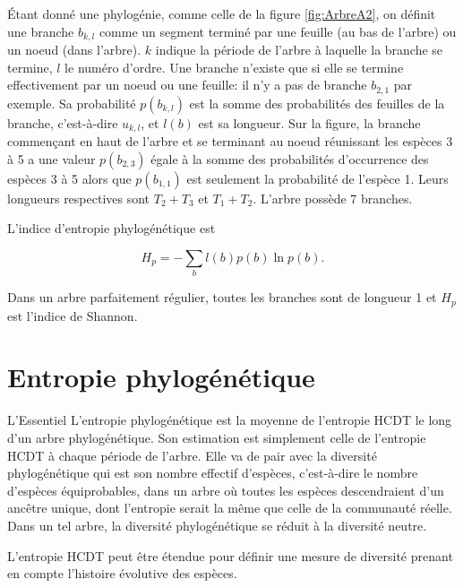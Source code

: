 \documentclass[
  11pt,
  french,
  a4paper,
  extrafontsizes,onecolumn,openright
  ]{memoir}
\newenvironment{Summary}
  {\begin{bclogo}[logo=\bctrombone, noborder=true, couleur=lightgray!50]{L'Essentiel}\parindent0pt}
  {\end{bclogo}}
\newlength{\rf}
\begin{document}
\normalsize

Étant donné une phylogénie, comme celle de la figure \ref{fig:ArbreA2}, on définit une branche \(b_{k,l}\) comme un segment terminé par une feuille (au bas de l'arbre) ou un noeud (dans l'arbre).
\(k\) indique la période de l'arbre à laquelle la branche se termine, \(l\) le numéro d'ordre.
Une branche n'existe que si elle se termine effectivement par un noeud ou une feuille: il n'y a pas de branche \(b_{2,1}\) par exemple.
Sa probabilité \(p(b_{k,l})\) est la somme des probabilités des feuilles de la branche, c'est-à-dire \(u_{k,l}\), et \(l(b)\) est sa longueur.
Sur la figure, la branche commençant en haut de l'arbre et se terminant au noeud réunissant les espèces 3 à 5 a une valeur \(p(b_{2,3})\) égale à la somme des probabilités d'occurrence des espèces 3 à 5 alors que \(p(b_{1,1})\) est seulement la probabilité de l'espèce 1.
Leurs longueurs respectives sont \(T_2+T_3\) et \(T_1+T_2\).
L'arbre possède 7 branches.

L'indice d'entropie phylogénétique est

\begin{equation}
  \label{eq:Hp}
  H_p =-\sum_{b}{l(b)p(b)\ln{p}(b)}.
\end{equation}

Dans un arbre parfaitement régulier, toutes les branches sont de longueur 1 et \(H_p\) est l'indice de Shannon.

\hypertarget{chap:Phyloentropie}{%
\chapter{Entropie phylogénétique}\label{chap:Phyloentropie}}

\scriptsize

\begin{Summary}
L'entropie phylogénétique est la moyenne de l'entropie HCDT le long d'un
arbre phylogénétique. Son estimation est simplement celle de l'entropie
HCDT à chaque période de l'arbre. Elle va de pair avec la diversité
phylogénétique qui est son nombre effectif d'espèces, c'est-à-dire le
nombre d'espèces équiprobables, dans un arbre où toutes les espèces
descendraient d'un ancêtre unique, dont l'entropie serait la même que
celle de la communauté réelle. Dans un tel arbre, la diversité
phylogénétique se réduit à la diversité neutre.
\end{Summary}

\normalsize

L'entropie HCDT peut être étendue pour définir une mesure de diversité prenant en compte l'histoire évolutive des espèces.
\end{document}
